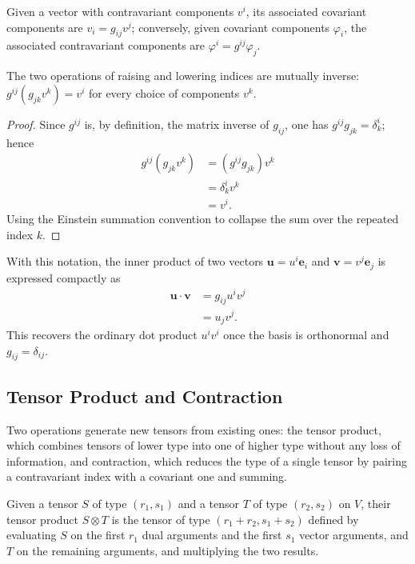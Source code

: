 \begin{definition}
Given a vector with contravariant components $v^i$, its associated covariant components are $v_i = g_{ij} v^j$; conversely, given covariant components $\varphi_i$, the associated contravariant components are $\varphi^i = g^{ij}\varphi_j$.

\end{definition}

\begin{theorem}
The two operations of raising and lowering indices are mutually inverse: $g^{ij}(g_{jk}v^k) = v^i$ for every choice of components $v^k$.

\end{theorem}

\begin{proof}
Since $g^{ij}$ is, by definition, the matrix inverse of $g_{ij}$, one has $g^{ij}g_{jk} = \delta^i_k$; hence
\[
\begin{aligned}
g^{ij}(g_{jk}v^k) &= (g^{ij}g_{jk})v^k \\[0.5em]
&= \delta^i_k v^k \\[0.5em]
&= v^i.
\end{aligned}
\]
Using the Einstein summation convention to collapse the sum over the repeated index $k$.
\end{proof}

With this notation, the inner product of two vectors $\mathbf{u} = u^i\mathbf{e}_i$ and $\mathbf{v}=v^j\mathbf{e}_j$ is expressed compactly as
\[
\begin{aligned}
\mathbf{u}\cdot\mathbf{v} &= g_{ij}u^iv^j \\[0.5em]
&= u_jv^j.
\end{aligned}
\]
This recovers the ordinary dot product $u^iv^i$ once the basis is orthonormal and $g_{ij}=\delta_{ij}$.

\subsection{Tensor Product and Contraction}

Two operations generate new tensors from existing ones: the tensor product, which combines tensors of lower type into one of higher type without any loss of information, and contraction, which reduces the type of a single tensor by pairing a contravariant index with a covariant one and summing.

\begin{definition}
Given a tensor $S$ of type $(r_1,s_1)$ and a tensor $T$ of type $(r_2,s_2)$ on $V$, their tensor product $S \otimes T$ is the tensor of type $(r_1+r_2, s_1+s_2)$ defined by evaluating $S$ on the first $r_1$ dual arguments and the first $s_1$ vector arguments, and $T$ on the remaining arguments, and multiplying the two results.
\end{definition}

